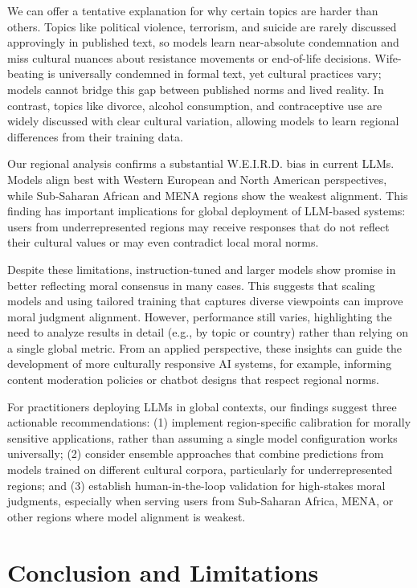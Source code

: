 \documentclass[a4paper,10pt,twoside]{article}
\begin{document}
We can offer a tentative explanation for why certain topics are harder than others. Topics like political violence, terrorism, and suicide are rarely discussed approvingly in published text, so models learn near-absolute condemnation and miss cultural nuances about resistance movements or end-of-life decisions. Wife-beating is universally condemned in formal text, yet cultural practices vary; models cannot bridge this gap between published norms and lived reality. In contrast, topics like divorce, alcohol consumption, and contraceptive use are widely discussed with clear cultural variation, allowing models to learn regional differences from their training data.

Our regional analysis confirms a substantial W.E.I.R.D. bias in current LLMs. Models align best with Western European and North American perspectives, while Sub-Saharan African and MENA regions show the weakest alignment. This finding has important implications for global deployment of LLM-based systems: users from underrepresented regions may receive responses that do not reflect their cultural values or may even contradict local moral norms.

Despite these limitations, instruction-tuned and larger models show promise in better reflecting moral consensus in many cases. This suggests that scaling models and using tailored training that captures diverse viewpoints can improve moral judgment alignment. However, performance still varies, highlighting the need to analyze results in detail (e.g., by topic or country) rather than relying on a single global metric. From an applied perspective, these insights can guide the development of more culturally responsive AI systems, for example, informing content moderation policies or chatbot designs that respect regional norms.

For practitioners deploying LLMs in global contexts, our findings suggest three actionable recommendations: (1) implement region-specific calibration for morally sensitive applications, rather than assuming a single model configuration works universally; (2) consider ensemble approaches that combine predictions from models trained on different cultural corpora, particularly for underrepresented regions; and (3) establish human-in-the-loop validation for high-stakes moral judgments, especially when serving users from Sub-Saharan Africa, MENA, or other regions where model alignment is weakest.


\section{Conclusion and Limitations}
\end{document}
